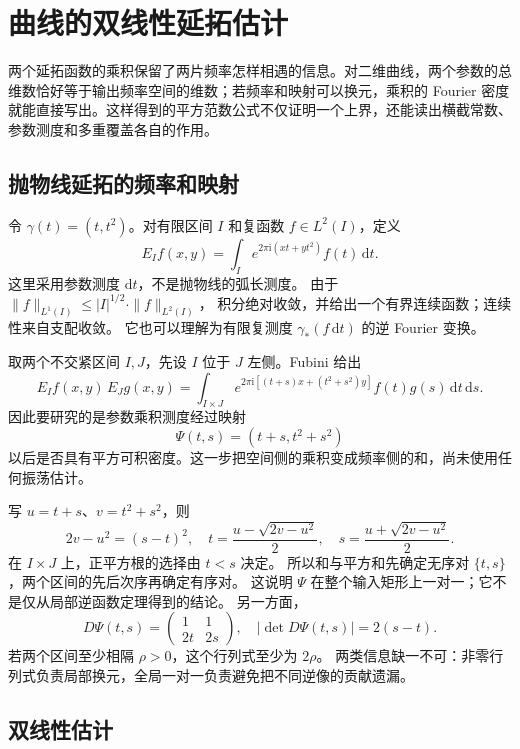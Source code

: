 \section{曲线的双线性延拓估计}
\label{b2:sec:2503}

两个延拓函数的乘积保留了两片频率怎样相遇的信息。对二维曲线，两个参数的总维数恰好等于输出频率空间的维数；若频率和映射可以换元，乘积的 Fourier 密度就能直接写出。这样得到的平方范数公式不仅证明一个上界，还能读出横截常数、参数测度和多重覆盖各自的作用。

\subsection{抛物线延拓的频率和映射}
\label{b2:subsec:250301}

令 \(\gamma(t)=(t,t^2)\)。对有限区间 \(I\) 和复函数
\(f\in L^2(I)\)，定义
\[
 E_If(x,y)=\int_I e^{2\pi\mathrm i(xt+yt^2)}f(t)\,\mathrm dt.
\]
这里采用参数测度 \(\mathrm dt\)，不是抛物线的弧长测度。
由于
\(\|f\|_{L^1(I)}\leq |I|^{1/2}\cdot\|f\|_{L^2(I)}\)，
积分绝对收敛，并给出一个有界连续函数；连续性来自支配收敛。
它也可以理解为有限复测度 \(\gamma_*(f\,\mathrm dt)\) 的逆 Fourier 变换。

取两个不交紧区间 \(I,J\)，先设 \(I\) 位于 \(J\) 左侧。Fubini 给出
\[
 E_If(x,y)\,E_Jg(x,y)
 =\int_{I\times J}
 e^{2\pi\mathrm i[(t+s)x+(t^2+s^2)y]}f(t)g(s)
 \,\mathrm dt\,\mathrm ds.
\]
因此要研究的是参数乘积测度经过映射
\[
 \Psi(t,s)=(t+s,t^2+s^2)
\]
以后是否具有平方可积密度。这一步把空间侧的乘积变成频率侧的和，尚未使用任何振荡估计。

\ProseParagraphBreak
写 \(u=t+s\)、\(v=t^2+s^2\)，则
\[
 2v-u^2=(s-t)^2,\quad
 t=\frac{u-\sqrt{2v-u^2}}2,\quad
 s=\frac{u+\sqrt{2v-u^2}}2.
\]
在 \(I\times J\) 上，正平方根的选择由 \(t<s\) 决定。
所以和与平方和先确定无序对 \(\{t,s\}\)，两个区间的先后次序再确定有序对。
这说明 \(\Psi\) 在整个输入矩形上一对一；它不是仅从局部逆函数定理得到的结论。
另一方面，
\[
 D\Psi(t,s)=
 \begin{pmatrix}1&1\\2t&2s\end{pmatrix},
 \quad
 |\det D\Psi(t,s)|=2(s-t).
\]
若两个区间至少相隔 \(\rho>0\)，这个行列式至少为 \(2\rho\)。
两类信息缺一不可：非零行列式负责局部换元，全局一对一负责避免把不同逆像的贡献遗漏。

\subsection{双线性估计}
\label{b2:subsec:250302}

